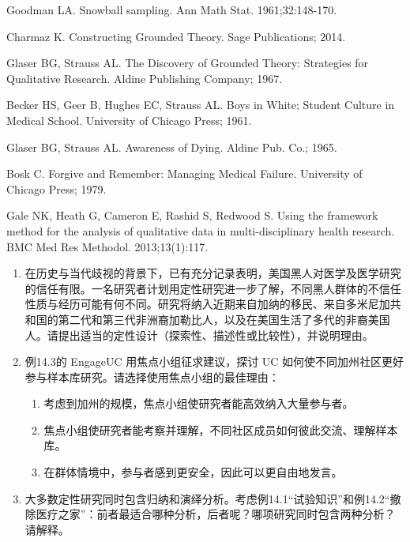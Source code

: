 \begin{references}
\item Goodman LA. Snowball sampling. Ann Math Stat. 1961;32:148-170.
\item Charmaz K. Constructing Grounded Theory. Sage Publications; 2014.
\item Glaser BG, Strauss AL. The Discovery of Grounded Theory: Strategies for Qualitative Research. Aldine Publishing Company; 1967.
\item Becker HS, Geer B, Hughes EC, Strauss AL. Boys in White; Student Culture in Medical School. University of Chicago Press; 1961.
\item Glaser BG, Strauss AL. Awareness of Dying. Aldine Pub. Co.; 1965.
\item Bosk C. Forgive and Remember: Managing Medical Failure. University of Chicago Press; 1979.
\item Gale NK, Heath G, Cameron E, Rashid S, Redwood S. Using the framework method for the analysis of qualitative data in multi-disciplinary health research. BMC Med Res Methodol. 2013;13(1):117.
\end{references}

\begin{enumerate}
\item 在历史与当代歧视的背景下，已有充分记录表明，美国黑人对医学及医学研究的信任有限。一名研究者计划用定性研究进一步了解，不同黑人群体的不信任性质与经历可能有何不同。研究将纳入近期来自加纳的移民、来自多米尼加共和国的第二代和第三代非洲裔加勒比人，以及在美国生活了多代的非裔美国人。请提出适当的定性设计（探索性、描述性或比较性），并说明理由。
\item 例14.3的 EngageUC 用焦点小组征求建议，探讨 UC 如何使不同加州社区更好参与样本库研究。请选择使用焦点小组的最佳理由：
\begin{enumerate}
\item 考虑到加州的规模，焦点小组使研究者能高效纳入大量参与者。
\item 焦点小组使研究者能考察并理解，不同社区成员如何彼此交流、理解样本库。
\item 在群体情境中，参与者感到更安全，因此可以更自由地发言。
\end{enumerate}
\item 大多数定性研究同时包含归纳和演绎分析。考虑例14.1“试验知识”和例14.2“撤除医疗之家”：前者最适合哪种分析，后者呢？哪项研究同时包含两种分析？请解释。
\end{enumerate}
